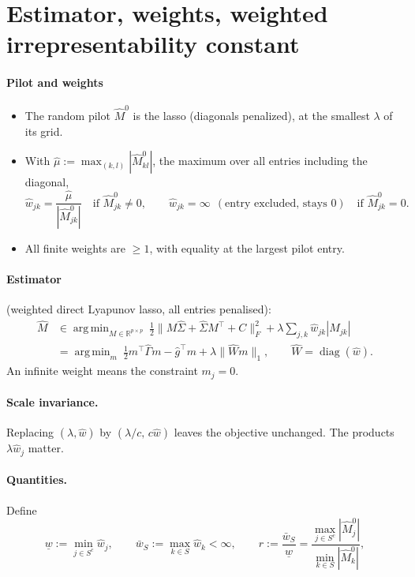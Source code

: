 \documentclass[11pt,a4paper]{article}
\numberwithin{equation}{section}
\theoremstyle{plain}
\theoremstyle{remark}
\DeclareMathOperator{\diag}{diag}
\DeclareMathOperator*{\argmin}{arg\,min}
\begin{document}
\section{Estimator, weights, weighted irrepresentability constant}\label{sec:estimator}

\paragraph{Pilot and weights}
\begin{itemize}
  \item The random pilot $\hat M^0$ is the lasso (diagonals penalized), at the smallest $\lambda$ of its grid.
  \item With $\hat\mu:=\max_{(k,l)}|\hat M^0_{kl}|$, the maximum over all entries including the diagonal,
  \[
  \hat w_{jk}=\frac{\hat\mu}{|\hat M^0_{jk}|}\quad\text{if }\hat M^0_{jk}\ne0,\qquad
  \hat w_{jk}=\infty\ \ (\text{entry excluded, stays }0)\quad\text{if }\hat M^0_{jk}=0 .
  \]
  \item All finite weights are $\ge1$, with equality at the largest pilot entry.
\end{itemize}

\paragraph{Estimator} (weighted direct Lyapunov lasso, all entries penalised):
\begin{equation}\label{eq:est}
\begin{split}
\hat M&\in\argmin_{M\in\mathbb R^{p\times p}}\ \tfrac12\|M\hat\Sigma+\hat\Sigma M^\top+C\|_F^2+\lambda\sum_{j,k}\hat w_{jk}|M_{jk}|\\
&=\argmin_m\ \tfrac12m^\top\hat\Gamma m-\hat g^\top m+\lambda\|\hat Wm\|_1,\qquad \hat W=\diag(\hat w).
\end{split}
\end{equation}
An infinite weight means the constraint $m_j=0$.

\paragraph{Scale invariance.} Replacing $(\lambda,\hat w)$ by $(\lambda/c,\,c\hat w)$ leaves the objective unchanged. The products $\lambda\hat w_j$ matter.

\paragraph{Quantities.} Define
\[
\underline w:=\min_{j\in S^c}\hat w_j,\qquad
\bar w_S:=\max_{k\in S}\hat w_k<\infty,\qquad
r:=\frac{\bar w_S}{\underline w}=\frac{\max_{j\in S^c}|\hat M^0_j|}{\min_{k\in S}|\hat M^0_k|},
\]
\end{document}
